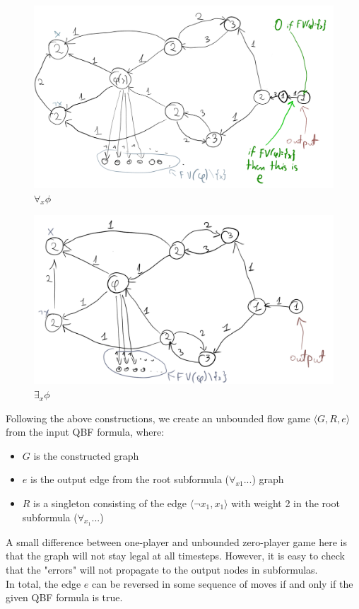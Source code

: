 \noindent
\begin{figure}[H]
      \centering
      \caption{$\forall_{x} \phi$}
      \includegraphics[scale=0.15]{content/graphics/game12.png}
\end{figure}

\noindent
\begin{figure}[H]
      \centering
      \caption{$\exists_{x} \phi$}
      \includegraphics[scale=0.15]{content/graphics/game13.png}
\end{figure}

\noindent
Following the above constructions, we create an unbounded flow game $\langle G, R, e \rangle$
from the input QBF formula, where:
\begin{itemize}
      \item $G$ is the constructed graph
      \item $e$ is the output edge from the root subformula ($\forall_{x1}...$) graph
      \item $R$ is a singleton consisting of the edge $\langle \lnot x_1, x_1 \rangle$ with weight 2
            in the root subformula ($\forall_{x_1}...$)
\end{itemize}
A small difference between one-player and unbounded zero-player game here is that the graph will not
stay legal at all timesteps. However, it is easy to check that the "errors" will not propagate to the
output nodes in subformulas.\\
In total, the edge $e$ can be reversed in some sequence of moves if and only if the given QBF formula is true.